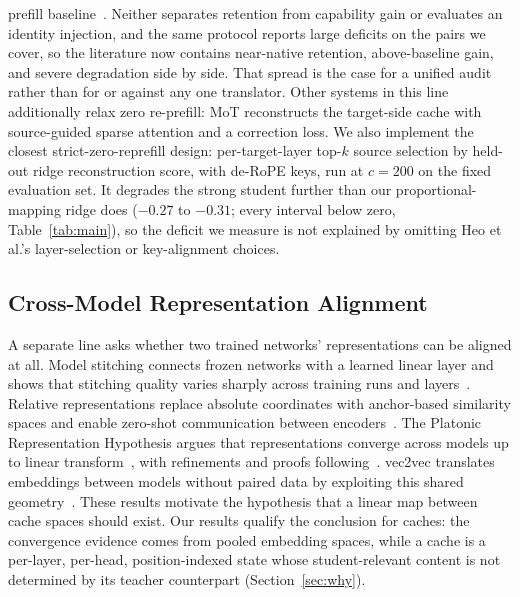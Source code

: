 \documentclass[10pt]{article}
\begin{document}
prefill baseline~\citep{contextreuse2026}. Neither separates retention from
capability gain or evaluates an identity injection, and the same protocol
reports large deficits on the pairs we cover, so the literature now contains
near-native retention, above-baseline gain, and severe degradation side by
side. That spread is the case for a unified audit rather than for or against
any one translator. Other systems in this line additionally relax zero re-prefill:
MoT reconstructs the target-side cache with source-guided sparse attention and
a correction loss. We also implement the closest strict-zero-reprefill design:
per-target-layer top-$k$ source selection by held-out ridge reconstruction
score, with de-RoPE keys, run at $c{=}200$ on the fixed evaluation set. It
degrades the strong student further than our proportional-mapping ridge does
($-0.27$ to $-0.31$; every interval below zero, Table~\ref{tab:main}), so the
deficit we measure is not explained by omitting Heo et al.'s layer-selection or
key-alignment choices.

\subsection{Cross-Model Representation Alignment}
A separate line asks whether two trained networks' representations can be
aligned at all. Model stitching connects frozen networks with a learned
linear layer and shows that stitching quality varies sharply across training
runs and layers~\citep{stitching2021}. Relative representations replace
absolute coordinates with anchor-based similarity spaces and enable zero-shot
communication between encoders~\citep{relrep2022}. The Platonic Representation
Hypothesis argues that representations converge across models up to linear
transform~\citep{platonic2024}, with refinements and proofs
following~\citep{aristotelian2026,perfectplatonic2025}. vec2vec translates
embeddings between models without paired data by exploiting this shared
geometry~\citep{vec2vec2025}. These results motivate the hypothesis that a
linear map between cache spaces should exist. Our results qualify the
conclusion for caches: the convergence evidence comes from pooled embedding
spaces, while a cache is a per-layer, per-head, position-indexed state whose
student-relevant content is not determined by its teacher counterpart
(Section~\ref{sec:why}).
\end{document}
